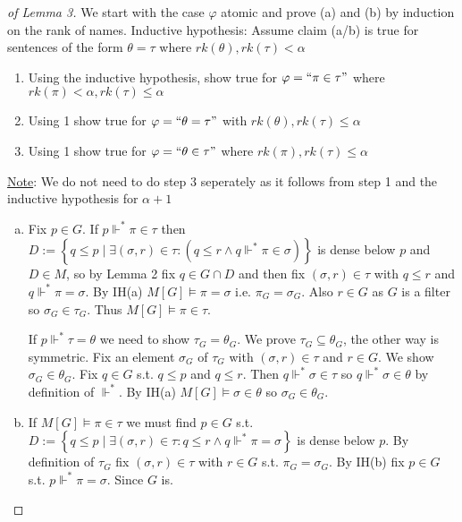 \documentclass{scrartcl}
\newcommand{\set}[1]{\left\{#1\right\}}
\theoremstyle{definition}
\theoremstyle{plain}
\theoremstyle{remark}
\begin{document}
	\begin{proof}[of Lemma 3]
		We start with the case $\varphi$ atomic and prove (a) and (b) by induction on the rank of names.
		Inductive hypothesis: Assume claim (a/b) is true for sentences of the form $\theta = \tau$ where $rk(\theta), rk(\tau) < \alpha$

		\begin{enumerate}[1.]
			\item Using the inductive hypothesis, show true for $\varphi = ``\pi \in \tau"$ where $rk(\pi) < \alpha, rk(\tau) \leq \alpha$
			\item Using 1 show true for $\varphi = ``\theta = \tau"$ with $rk(\theta), rk(\tau) \leq \alpha$
			\item Using 1 show true for $\varphi = ``\theta \in \tau"$ where $rk(\pi), rk(\tau) \leq \alpha$
		\end{enumerate}
		\underline{Note}: We do not need to do step 3 seperately as it follows from step 1 and the inductive hypothesis for $\alpha+1$

		\begin{enumerate}[(a)]
			\item Fix $p \in G$. If $p \Vdash^* \pi \in \tau$ then $D:= \set{q \leq p \mid \exists (\sigma, r) \in \tau: (q  \leq r \land q \Vdash^* \pi \in \sigma)}$
			is dense below $p$ and $D \in M$, so by Lemma 2 fix $q \in G \cap D$ and then fix $(\sigma, r) \in \tau$ with $q \leq r$ and $q \Vdash^* \pi = \sigma$.
			By IH(a) $M[G] \vDash \pi = \sigma$ i.e. $\pi_G = \sigma_G$. Also $r \in G$ as $G$ is a filter so $\sigma_G \in \tau_G$. Thus $M[G] \vDash \pi \in \tau$.

			If $p \Vdash^* \tau = \theta$ we need to show $\tau_G = \theta_G$. We prove $\tau_G \subseteq \theta_G$, the other way is symmetric.
			Fix an element $\sigma_G$ of $\tau_G$ with $(\sigma, r) \in \tau$ and $r \in G$. We show $\sigma_G \in \theta_G$. Fix $q \in G$ s.t.
			$q \leq p$ and $q \leq r$. Then $q \Vdash^* \sigma \in \tau$ so $q \Vdash^* \sigma \in \theta$ by definition of $\Vdash^*$. By IH(a)
			$M[G] \vDash \sigma \in \theta$ so $\sigma_G \in \theta_G$.

			\item If $M[G] \vDash \pi \in \tau$ we must find $p \in G$ s.t. $D := \set{q \leq p \mid \exists (\sigma, r) \in \tau: q \leq r \land q \Vdash^* \pi = \sigma}$ is 
			dense below $p$. By definition of $\tau_G$ fix $(\sigma, r) \in \tau$ with $r \in G$ s.t. $\pi_G = \sigma_G$. By IH(b) fix $p \in G$ s.t. $p \Vdash^* \pi = \sigma$.
			Since $G$ is.


\end{enumerate}
\end{proof}
\end{document}
